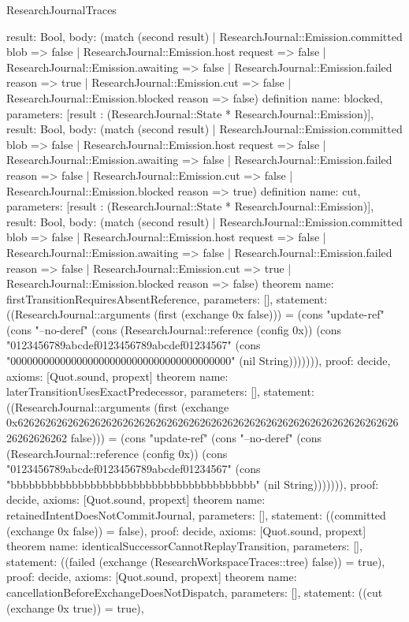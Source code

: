 \begin{lexlean}{ResearchJournalTraces}
\begin{semanticmodule}
{ result: Bool,
 body: (match (second result) | ResearchJournal::Emission.committed blob => false | ResearchJournal::Emission.host request => false | ResearchJournal::Emission.awaiting => false | ResearchJournal::Emission.failed reason => true | ResearchJournal::Emission.cut => false | ResearchJournal::Emission.blocked reason => false)
}
definition{
 name: blocked,
 parameters: [result : (ResearchJournal::State * ResearchJournal::Emission)],
 result: Bool,
 body: (match (second result) | ResearchJournal::Emission.committed blob => false | ResearchJournal::Emission.host request => false | ResearchJournal::Emission.awaiting => false | ResearchJournal::Emission.failed reason => false | ResearchJournal::Emission.cut => false | ResearchJournal::Emission.blocked reason => true)
}
definition{
 name: cut,
 parameters: [result : (ResearchJournal::State * ResearchJournal::Emission)],
 result: Bool,
 body: (match (second result) | ResearchJournal::Emission.committed blob => false | ResearchJournal::Emission.host request => false | ResearchJournal::Emission.awaiting => false | ResearchJournal::Emission.failed reason => false | ResearchJournal::Emission.cut => true | ResearchJournal::Emission.blocked reason => false)
}
theorem{
 name: firstTransitionRequiresAbsentReference,
 parameters: [],
 statement: ((ResearchJournal::arguments (first (exchange 0x false))) = (cons "update-ref" (cons "--no-deref" (cons (ResearchJournal::reference (config 0x)) (cons "0123456789abcdef0123456789abcdef01234567" (cons "0000000000000000000000000000000000000000" (nil String))))))),
 proof: decide{},
 axioms: [Quot.sound, propext]
}
theorem{
 name: laterTransitionUsesExactPredecessor,
 parameters: [],
 statement: ((ResearchJournal::arguments (first (exchange 0x62626262626262626262626262626262626262626262626262626262626262626262626262626262 false))) = (cons "update-ref" (cons "--no-deref" (cons (ResearchJournal::reference (config 0x)) (cons "0123456789abcdef0123456789abcdef01234567" (cons "bbbbbbbbbbbbbbbbbbbbbbbbbbbbbbbbbbbbbbbb" (nil String))))))),
 proof: decide{},
 axioms: [Quot.sound, propext]
}
theorem{
 name: retainedIntentDoesNotCommitJournal,
 parameters: [],
 statement: ((committed (exchange 0x false)) = false),
 proof: decide{},
 axioms: [Quot.sound, propext]
}
theorem{
 name: identicalSuccessorCannotReplayTransition,
 parameters: [],
 statement: ((failed (exchange (ResearchWorkspaceTraces::tree) false)) = true),
 proof: decide{},
 axioms: [Quot.sound, propext]
}
theorem{
 name: cancellationBeforeExchangeDoesNotDispatch,
 parameters: [],
 statement: ((cut (exchange 0x true)) = true),
}
\end{semanticmodule}
\end{lexlean}
